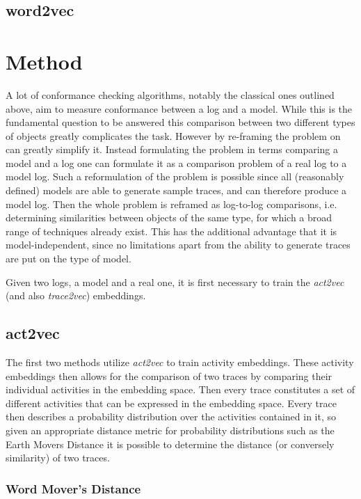 \documentclass[runningheads]{template/llncs}
\begin{document}
\subsection{word2vec}

\section{Method}

A lot of conformance checking algorithms, notably the classical ones outlined above, aim to measure conformance between a log and a model.
While this is the fundamental question to be answered this comparison between two different types of objects greatly complicates the task.
However by re-framing the problem on can greatly simplify it.
Instead formulating the problem in terms comparing a model and a log one can formulate it as a comparison problem of a real log to a model log.
Such a reformulation of the problem is possible since all (reasonably defined) models are able to generate sample traces, and can therefore produce a model log.
Then the whole problem is reframed as log-to-log comparisons, i.e. determining similarities between objects of the same type, for which a broad range of techniques already exist.
This has the additional advantage that it is model-independent, since no limitations apart from the ability to generate traces are put on the type of model.

Given two logs, a model and a real one, it is first necessary to train the \emph{act2vec}\cite{KBWe18} (and also \emph{trace2vec}) embeddings.

\subsection{act2vec}
The first two methods utilize \emph{act2vec} to train activity embeddings.
These activity embeddings then allows for the comparison of two traces by comparing their individual activities in the embedding space.
Then every trace constitutes a set of different activities that can be expressed in the embedding space.
Every trace then describes a probability distribution over the activities contained in it, so given an appropriate distance metric for probability distributions such as the Earth Movers Distance it is possible to determine the distance (or conversely similarity) of two traces.

\subsubsection{Word Mover's Distance}
\end{document}
